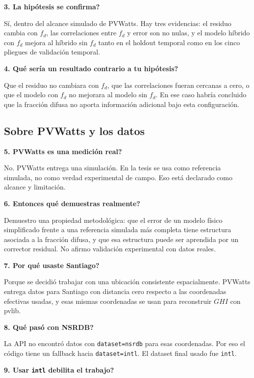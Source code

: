 \documentclass[11pt, letterpaper]{article}
\newcommand{\fd}{f_d}
\begin{document}
\textbf{3. \textquestiondown La hip\'otesis se confirma?}

S\'i, dentro del alcance simulado de PVWatts. Hay tres evidencias: el residuo cambia con \(\fd\), las correlaciones entre \(\fd\) y error son no nulas, y el modelo h\'ibrido con \(\fd\) mejora al h\'ibrido sin \(\fd\) tanto en el holdout temporal como en los cinco pliegues de validaci\'on temporal.

\textbf{4. \textquestiondown Qu\'e ser\'ia un resultado contrario a tu hip\'otesis?}

Que el residuo no cambiara con \(\fd\), que las correlaciones fueran cercanas a cero, o que el modelo con \(\fd\) no mejorara al modelo sin \(\fd\). En ese caso habr\'ia concluido que la fracci\'on difusa no aporta informaci\'on adicional bajo esta configuraci\'on.

\subsection{Sobre PVWatts y los datos}

\textbf{5. \textquestiondown PVWatts es una medici\'on real?}

No. PVWatts entrega una simulaci\'on. En la tesis se usa como referencia simulada, no como verdad experimental de campo. Eso est\'a declarado como alcance y limitaci\'on.

\textbf{6. \textquestiondown Entonces qu\'e demuestras realmente?}

Demuestro una propiedad metodol\'ogica: que el error de un modelo f\'isico simplificado frente a una referencia simulada m\'as completa tiene estructura asociada a la fracci\'on difusa, y que esa estructura puede ser aprendida por un corrector residual. No afirmo validaci\'on experimental con datos reales.

\textbf{7. \textquestiondown Por qu\'e usaste Santiago?}

Porque se decidi\'o trabajar con una ubicaci\'on consistente espacialmente. PVWatts entrega datos para Santiago con distancia cero respecto a las coordenadas efectivas usadas, y esas mismas coordenadas se usan para reconstruir \(GHI\) con pvlib.

\textbf{8. \textquestiondown Qu\'e pas\'o con NSRDB?}

La API no encontr\'o datos con \texttt{dataset=nsrdb} para esas coordenadas. Por eso el c\'odigo tiene un fallback hacia \texttt{dataset=intl}. El dataset final usado fue \texttt{intl}.

\textbf{9. \textquestiondown Usar \texttt{intl} debilita el trabajo?}
\end{document}
